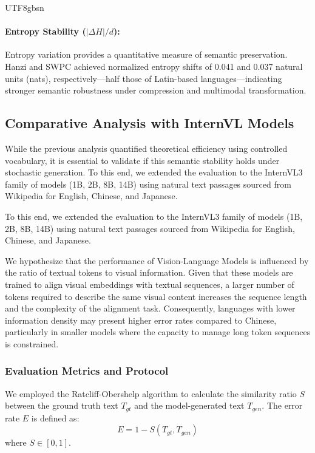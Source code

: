 \documentclass[conference]{IEEEtran}
\begin{document}
\begin{CJK*}{UTF8}{gbsn}
\paragraph{Entropy Stability ($|\Delta H|/d$):}  
Entropy variation provides a quantitative measure of semantic preservation.  
Hanzi and SWPC achieved normalized entropy shifts of 0.041 and 0.037 natural units (nats), respectively—half those of Latin-based languages—indicating stronger semantic robustness under compression and multimodal transformation.

\subsection{Comparative Analysis with InternVL Models}

While the previous analysis quantified theoretical efficiency using controlled vocabulary, it is essential to validate if this semantic stability holds under stochastic generation. To this end, we extended the evaluation to the InternVL3 family of models (1B, 2B, 8B, 14B) using natural text passages sourced from Wikipedia for English, Chinese, and Japanese.

To this end, we extended the evaluation to the InternVL3 family of models (1B, 2B, 8B, 14B) using natural text passages sourced from Wikipedia for English, Chinese, and Japanese.

We hypothesize that the performance of Vision-Language Models is influenced by the ratio of textual tokens to visual information. Given that these models are trained to align visual embeddings with textual sequences, a larger number of tokens required to describe the same visual content increases the sequence length and the complexity of the alignment task. Consequently, languages with lower information density may present higher error rates compared to Chinese, particularly in smaller models where the capacity to manage long token sequences is constrained.

\subsubsection{Evaluation Metrics and Protocol}
We employed the Ratcliff-Obershelp algorithm to calculate the similarity ratio $S$ between the ground truth text $T_{gt}$ and the model-generated text $T_{gen}$. The error rate $E$ is defined as:
\begin{equation}
E = 1 - S(T_{gt}, T_{gen})
\end{equation}
where $S \in [0, 1]$.


\end{CJK*}
\end{document}
